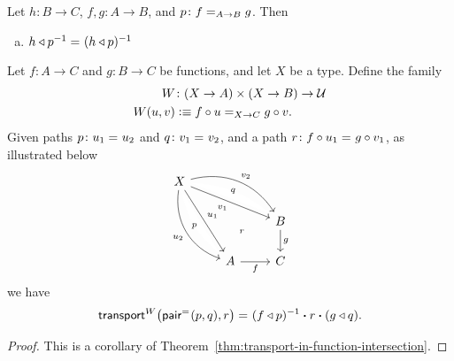 \begin{prop}\label{prop:function-path-whiskering-properties}
    Let $h\colon B\to C$, $f,g\colon A\to B$, and $p\colon f\eq{A\to B}g$. Then
    \begin{enumerate}[a),font=\upshape]
        \item $h\triangleleft p^{-1}\mathrel{=_{}}(h\triangleleft p)^{-1}$
    \end{enumerate}
\end{prop}

\begin{prop}\label{prop:transport-in-commutative-squares}
    Let\/ $f\colon A\to C$ and\/ $g\colon B\to C$ be functions, and let\/ $X$ be a type. Define the family
    \begin{align*}
        W&\colon(X\to A)\times(X\to B)\to\univ\\
        W(u,v)&\defeq f\circ u\eq{X\to C}g\circ v.
    \end{align*}
    Given paths\/ $p\colon u_1\eq{}u_2$ and\/ $q\colon v_1\eq{}v_2$, and a path\/ $r\colon f\circ u_1\eq{}g\circ v_1$, as illustrated below
    \[
        \begin{tikzcd}
            X
                    \arrow[rdd,"u_1"]
                    \arrow[rrd,"v_1"']
                    \arrow[rdd,"u_2"',bend right=40]
                    \arrow[rrd,"v_2",bend left=36]
                    \arrow[rrdd,
                        "\scriptstyle r",
                        phantom,
                        description,
                        pos=0.65]
                    \arrow[rdd,
                        "\scriptstyle p",
                        phantom,
                        description,
                        bend right=20,
                        pos=0.5]
                    \arrow[rrd,
                        "\scriptstyle q",
                        phantom,
                        description,
                        bend left=18,
                        pos=0.5]\\
                &&B
                    \arrow[d,"g"]\\
                &A
                    \arrow[r,"f"']
                &C
        \end{tikzcd}
    \]
    we have
    \[
        \mathsf{transport}^W\bigl(\mathsf{pair}^{\mathrel{=_{}}}(p,q),r\bigr)
            \mathrel{=_{}}(f\triangleleft p)^{-1}\mathbin{\boldsymbol{\cdot}} r\mathbin{\boldsymbol{\cdot}}(g\triangleleft q).
    \]
\end{prop}

\begin{proof}
    This is a corollary of Theorem~\ref{thm:transport-in-function-intersection}.
\end{proof}

